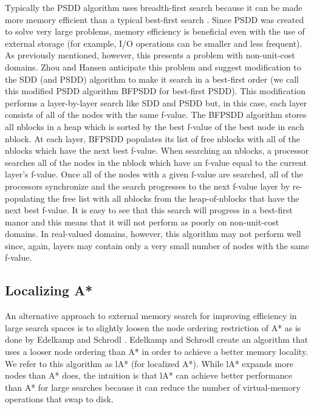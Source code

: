 \documentclass{article}
\begin{document}
Typically the PSDD algorithm uses breadth-first search because it can
be made more memory efficient than a typical best-first search
\cite{zhou:bhs}.  Since PSDD was created to solve very large problems,
memory efficiency is beneficial even with the use of external storage
(for example, I/O operations can be smaller and less frequent).  As
previously mentioned, however, this presents a problem with
non-unit-cost domains.  Zhou and Hansen anticipate this problem and
suggest modification to the SDD (and PSDD) algorithm to make it search
in a best-first order \cite{zhou:sdd} (we call this modified PSDD
algorithm BFPSDD for best-first PSDD).  This modification performs a
layer-by-layer search like SDD and PSDD but, in this case, each layer
consists of all of the nodes with the same f-value.  The BFPSDD
algorithm stores all nblocks in a heap which is sorted by the best
f-value of the best node in each nblock.  At each layer, BFPSDD
populates its list of free nblocks with all of the nblocks which have
the next best f-value.  When searching an nblocks, a processor
searches all of the nodes in the nblock which have an f-value equal to
the current layer's f-value.  Once all of the nodes with a given
f-value are searched, all of the processors synchronize and the search
progresses to the next f-value layer by re-populating the free list
with all nblocks from the heap-of-nblocks that have the next best
f-value.  It is easy to see that this search will progress in a
best-first manor and this means that it will not perform as poorly on
non-unit-cost domains.  In real-valued domains, however, this
algorithm may not perform well since, again, layers may contain only a
very small number of nodes with the same f-value.


\subsection{Localizing A*}

An alternative approach to external memory search for improving
efficiency in large search spaces is to slightly loosen the node
ordering restriction of A* as is done by Edelkamp and Schrodl
\cite{edelkamp:loc}.  Edelkamp and Schrodl create an algorithm that
uses a looser node ordering than A* in order to achieve a better
memory locality. We refer to this algorithm as lA* (for localized A*).
While lA* expands more nodes than A* does, the intuition is that lA*
can achieve better performance than A* for large searches because it
can reduce the number of virtual-memory operations that swap to disk.
\end{document}
